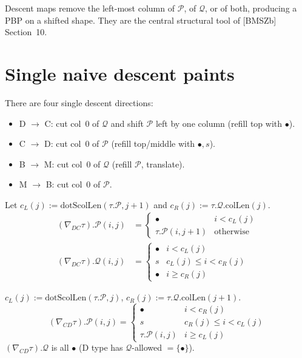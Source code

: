 Descent maps remove the left-most column of $\mathcal{P}$, of $\mathcal{Q}$, or
of both, producing a PBP on a shifted shape. They are the central structural
tool of [BMSZb] Section~10.

\section{Single naive descent paints}

There are four single descent directions:
\begin{itemize}
\item D $\to$ C: cut col~0 of $\mathcal{Q}$ and shift $\mathcal{P}$ left by one column (refill top with $\bullet$).
\item C $\to$ D: cut col~0 of $\mathcal{P}$ (refill top/middle with $\bullet, s$).
\item B $\to$ M: cut col~0 of $\mathcal{Q}$ (refill $\mathcal{P}$, translate).
\item M $\to$ B: cut col~0 of $\mathcal{P}$.
\end{itemize}

\begin{definition}[D $\to$ C paints]
  \label{def:descentPaint_DC}
  \leanok
  Let $c_L(j) := \mathrm{dotScolLen}(\tau.\mathcal{P}, j + 1)$ and $c_R(j) := \tau.\mathcal{Q}.\mathrm{colLen}(j)$.
  \begin{align*}
    (\nabla_{DC}\tau).\mathcal{P}(i, j) &= \begin{cases} \bullet & i < c_L(j) \\ \tau.\mathcal{P}(i, j + 1) & \text{otherwise} \end{cases} \\
    (\nabla_{DC}\tau).\mathcal{Q}(i, j) &= \begin{cases} \bullet & i < c_L(j) \\ s & c_L(j) \leq i < c_R(j) \\ \bullet & i \geq c_R(j) \end{cases}
  \end{align*}
\end{definition}

\begin{definition}[C $\to$ D paints]
  \label{def:descentPaint_CD}
  \leanok
  $c_L(j) := \mathrm{dotScolLen}(\tau.\mathcal{P}, j)$, $c_R(j) := \tau.\mathcal{Q}.\mathrm{colLen}(j + 1)$.
  \[
    (\nabla_{CD}\tau).\mathcal{P}(i, j) = \begin{cases} \bullet & i < c_R(j) \\ s & c_R(j) \leq i < c_L(j) \\ \tau.\mathcal{P}(i, j) & i \geq c_L(j) \end{cases}
  \]
  $(\nabla_{CD}\tau).\mathcal{Q}$ is all $\bullet$ (D type has $\mathcal{Q}$-allowed $= \{\bullet\}$).
\end{definition}


